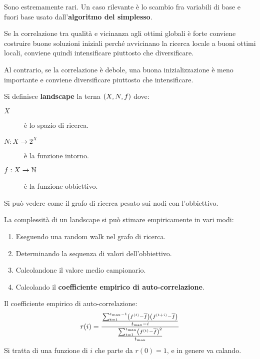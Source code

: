 \documentclass[\main/main.tex]{subfiles}
\begin{document}
\begin{multicols}{2}
\begin{definition}
    Sono estremamente rari. Un caso rilevante è lo scambio fra variabili di base e fuori base usato dall'\textbf{algoritmo del simplesso}.
\end{definition}
\begin{observation}
    Se la correlazione tra qualità e vicinanza agli ottimi globali è forte conviene costruire buone soluzioni iniziali perché avvicinano la ricerca locale a buoni ottimi locali, conviene quindi intensificare piuttosto che diversificare.

    Al contrario, se la correlazione è debole, una buona inizializzazione è meno importante e conviene diversificare piuttosto che intensificare.
\end{observation}
\begin{definition}[Landscape]
    Si definisce \textbf{landscape} la terna \(\left(X, N , f\right)\) dove:
    \begin{description}
        \item[\(X\)] è lo spazio di ricerca.
        \item[\(N: X \rightarrow 2^X\)] è la funzione intorno.
        \item[\(f: X \rightarrow \mathbb{N}\)] è la funzione obbiettivo.
    \end{description}
    
    Si può vedere come il grafo di ricerca pesato sui nodi con l'obbiettivo.
\end{definition}
\begin{observation}
    La complessità di un landscape si può stimare empiricamente in vari modi:
\begin{enumerate}
    \item Eseguendo una random walk nel grafo di ricerca.
    \item Determinando la sequenza di valori dell'obbiettivo.
    \item Calcolandone il valore medio campionario.
    \item Calcolando il \textbf{coefficiente empirico di auto-correlazione}.
\end{enumerate}
\end{observation}

\begin{definition}
    Il coefficiente empirico di auto-correlazione:
    \[
        r(i) = \frac{\frac{\sum_{t=1}^{t_{\max}-1} \left(f^{(t)} - \overline{f}\right)\left(f^{(t+i)} - \overline{f}\right)}{t_{\max}-i}}{\frac{\sum_{t=1}^{t_{\max}} \left(f^{(t)} - \overline{f}\right)^2}{t_{\max}}}
    \]
    Si tratta di una funzione di \(i\) che parte da \(r(0) = 1\), e in genere va calando.
    

\end{definition}
\end{multicols}
\end{document}
